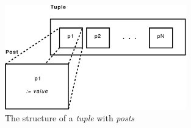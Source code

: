 \begin{figure}[htp]
\begin{center}
  \includegraphics[width=0.7\textwidth]{diagrams/tuple_post}
  \caption[Tuple/Post]{The structure of a \textit{tuple} with \textit{posts}}
  \label{fig:method:tuple_post}
\end{center}
\end{figure}